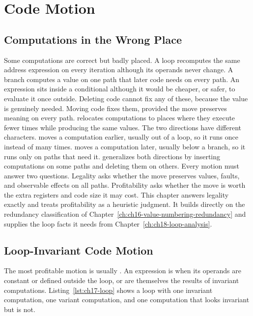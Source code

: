 \chapter{Code Motion}
\label{ch:ch17-code-motion}

\section{Computations in the Wrong Place}
\label{sec:ch17-wrong-place}

Some computations are correct but badly placed.
A loop recomputes the same address expression on every iteration although its operands never change.
A branch computes a value on one path that later code needs on every path.
An expression sits inside a conditional although it would be cheaper, or safer, to evaluate it once outside.
Deleting code cannot fix any of these, because the value is genuinely needed.
Moving code fixes them, provided the move preserves meaning on every path.
 relocates computations to places where they execute fewer times while producing the same values.
The two directions have different characters.
 moves a computation earlier, usually out of a loop, so it runs once instead of many times.
 moves a computation later, usually below a branch, so it runs only on paths that need it.
 generalizes both directions by inserting computations on some paths and deleting them on others.
Every motion must answer two questions.
Legality asks whether the move preserves values, faults, and observable effects on all paths.
Profitability asks whether the move is worth the extra registers and code size it may cost.
This chapter answers legality exactly and treats profitability as a heuristic judgment.
It builds directly on the redundancy classification of Chapter~\ref{ch:ch16-value-numbering-redundancy} and supplies the loop facts it needs from Chapter~\ref{ch:ch18-loop-analysis}.

\section{Loop-Invariant Code Motion}
\label{sec:ch17-invariant-motion}

The most profitable motion is usually .
An expression is  when its operands are constant or defined outside the loop, or are themselves the results of invariant computations.
Listing~\ref{lst:ch17-loop} shows a loop with one invariant computation, one variant computation, and one computation that looks invariant but is not.

